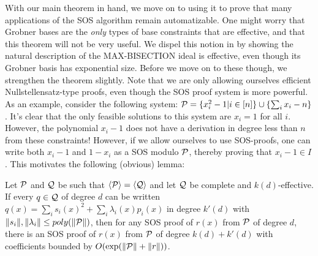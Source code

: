With our main theorem in hand, we move on to using it to prove that many applications of the SOS algorithm remain automatizable. One might worry that Grobner bases are the \emph{only} types of base constraints that are effective, and that this theorem will not be very useful. We dispel this notion in  by showing the natural description of the MAX-BISECTION ideal is effective, even though its Grobner basis has exponential size. Before we move on to these though, we strengthen the theorem slightly. Note that we are only allowing ourselves efficient Nullstellensatz-type proofs, even though the SOS proof system is more powerful. As an example, consider the following system: $\mathcal P = \{x_i^2 - 1 | i \in [n]\} \cup \{\sum_i x_i - n\}$. It's clear that the only feasible solutions to this system are $x_i = 1$ for all $i$. However, the polynomial $x_i - 1$ does not have a derivation in degree less than $n$ from these constraints! However, if we allow ourselves to use SOS-proofs, one can write both $x_i - 1$ and $1 - x_i$ as a SOS modulo $\mathcal P$, thereby proving that $x_i - 1 \in I$. This motivates the following (obvious) lemma:
\begin{lemma}\label{lem:sos-lemma}
Let $\mathcal P$ and $\mathcal Q$ be such that $\langle \mathcal P\rangle = \langle \mathcal Q\rangle$ and let $\mathcal Q$ be complete and $k(d)$-effective. If every $q \in \mathcal Q$ of degree $d$ can be written $q(x) = \sum_i s_i(x)^2 + \sum_i \lambda_i(x)p_i(x)$ in degree $k'(d)$ with $\|s_i\|, \|\lambda_i\| \leq poly(\|\mathcal P\|)$, then for any SOS proof of $r(x)$ from $\mathcal P$ of degree $d$, there is an SOS proof of $r(x)$ from $\mathcal P$ of degree $k(d) + k'(d)$ with coefficients bounded by $O(\exp(\|\mathcal P\| + \|r\|))$.
\end{lemma}
